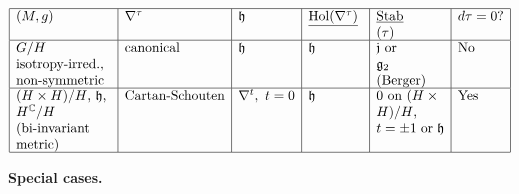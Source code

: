 \[
\begin{array}{|l|l|l|l|l|l|}
\hline
\parbox[t]{7em}{\raggedright
$(M,g)$}
&
\nabla^\tau
&
\parbox[t]{4em}{\raggedright
$\mathfrak h$}
&
\underline{\operatorname{Hol}
(\nabla^\tau)}
&
\parbox[t]{5em}{\raggedright
$
\underline{\operatorname{Stab}}
$
\\
$(\tau)$}
&
d\tau=0?
\\
\hline
\parbox[t]{7em}{\raggedright
$G/H$ isotropy-irred.,\\
non-symmetric}
&
\text{canonical}
&
\parbox[t]{4em}{\raggedright
$\mathfrak h$}
&
\mathfrak h
&
\parbox[t]{5em}{\raggedright
$\mathfrak j$ or\\
$\mathfrak g_2$\\
(Berger)}
&
\text{No}
\\
\hline
\parbox[t]{7em}{\raggedright
$(H\times H)/H$, $\mathfrak h$,\\
$H^\mathbb{C}/H$\\
(bi-invariant metric)}
&
\text{Cartan-Schouten}
&
\nabla^t,\ t=0
&
\parbox[t]{4em}{\raggedright
$\mathfrak h$}
&
\parbox[t]{5em}{\raggedright
0 on $(H\times H)/H$,\\
$t=\pm1$ or $\mathfrak h$}
&
\text{Yes}
\\
\hline
\end{array}
\]

\medskip\noindent
{\bf Special cases.}

